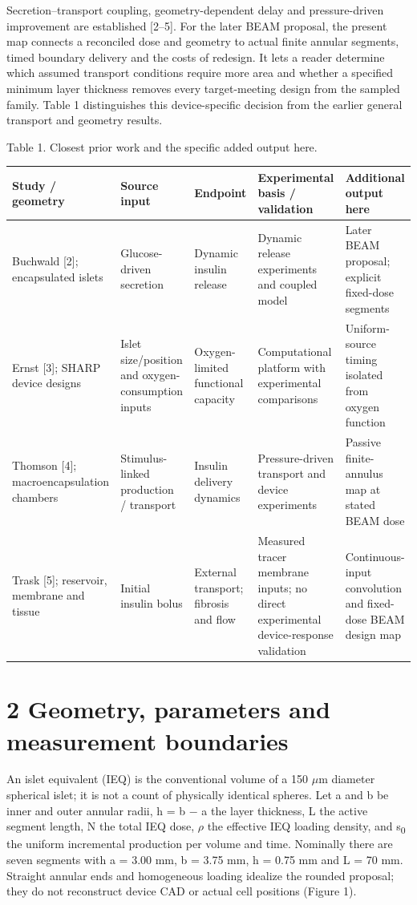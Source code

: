 \documentclass[11pt]{article}
\begin{document}
Secretion--transport coupling, geometry-dependent delay and pressure-driven improvement are established [2--5]. For the later BEAM proposal, the present map connects a reconciled dose and geometry to actual finite annular segments, timed boundary delivery and the costs of redesign. It lets a reader determine which assumed transport conditions require more area and whether a specified minimum layer thickness removes every target-meeting design from the sampled family. Table 1 distinguishes this device-specific decision from the earlier general transport and geometry results.

\par\begin{table}[htbp]\centering\small Table 1. Closest prior work and the specific added output here.\\[4pt]\begin{tabularx}{\linewidth}{>{\raggedright\arraybackslash}X>{\raggedright\arraybackslash}X>{\raggedright\arraybackslash}X>{\raggedright\arraybackslash}X>{\raggedright\arraybackslash}X}\toprule
Study / geometry & Source input & Endpoint & Experimental basis / validation & Additional output here\\\midrule
Buchwald [2]; encapsulated islets & Glucose-driven secretion & Dynamic insulin release & Dynamic release experiments and coupled model & Later BEAM proposal; explicit fixed-dose segments\\
Ernst [3]; SHARP device designs & Islet size/position and oxygen-consumption inputs & Oxygen-limited functional capacity & Computational platform with experimental comparisons & Uniform-source timing isolated from oxygen function\\
Thomson [4]; macroencapsulation chambers & Stimulus-linked production / transport & Insulin delivery dynamics & Pressure-driven transport and device experiments & Passive finite-annulus map at stated BEAM dose\\
Trask [5]; reservoir, membrane and tissue & Initial insulin bolus & External transport; fibrosis and flow & Measured tracer membrane inputs; no direct experimental device-response validation & Continuous-input convolution and fixed-dose BEAM design map\\
\bottomrule\end{tabularx}\end{table}\par
\section*{2 Geometry, parameters and measurement boundaries}
An islet equivalent (IEQ) is the conventional volume of a 150 \ensuremath{\mu}m diameter spherical islet; it is not a count of physically identical spheres. Let a and b be inner and outer annular radii, h = b \ensuremath{-} a the layer thickness, L the active segment length, N the total IEQ dose, \ensuremath{\rho} the effective IEQ loading density, and s\textsubscript{0} the uniform incremental production per volume and time. Nominally there are seven segments with a = 3.00 mm, b = 3.75 mm, h = 0.75 mm and L = 70 mm. Straight annular ends and homogeneous loading idealize the rounded proposal; they do not reconstruct device CAD or actual cell positions (Figure 1).
\end{document}
